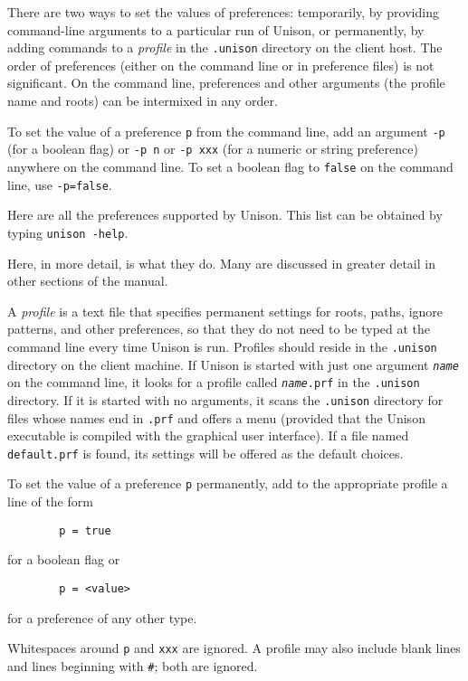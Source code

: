 \documentclass{article}
\newcommand{\ARG}[1]{\texttt{\textit{#1}}}
\begin{document}
There are two ways to set the values of preferences: temporarily, by
providing command-line arguments to a particular run of Unison, or
permanently, by adding commands to a {\em profile} in the {\tt .unison}
directory on the client host.  The order of preferences (either on the
command line or in preference files) is not significant.  On the command
line, preferences and other arguments (the profile name and roots) can be
intermixed in any order.

To set the value of a preference {\tt p} from the command line, add an
argument {\tt -p} (for a boolean flag) or {\tt -p n} or {\tt -p xxx} (for
a numeric or string preference) anywhere on the command line.  To set a
boolean flag to \verb|false| on the command line, use {\tt -p=false}.

Here are all the preferences supported by Unison.  This list can be
  obtained by typing {\tt unison -help}.
\begin{quote}

\end{quote}
Here, in more detail, is what they do.  Many are discussed in greater detail
in other sections of the manual.
%




A {\em profile} is a text file that specifies permanent settings for
roots, paths, ignore patterns, and other preferences, so that they do
not need to be typed at the command line every time Unison is run.
Profiles should reside in the \verb|.unison| directory on the client
machine.  If Unison is started with just one argument \ARG{name} on
the command line, it looks for a profile called \texttt{\ARG{name}.prf} in
the \verb|.unison| directory.  If it is started with no arguments, it
scans the \verb|.unison| directory for files whose names end in
\verb|.prf| and offers a menu (provided that the Unison executable is compiled with the graphical user interface).  If a file named \verb|default.prf| is
found, its settings will be offered as the default choices.

To set the value of a preference {\tt p} permanently, add to the
appropriate profile a line of the form
\begin{verbatim}
        p = true
\end{verbatim}
for a boolean flag or
\begin{verbatim}
        p = <value>
\end{verbatim}
for a preference of any other type.

Whitespaces around {\tt p} and {\tt xxx} are ignored.
A profile may also include blank lines and lines beginning
with {\tt \#}; both are ignored.
\end{document}
